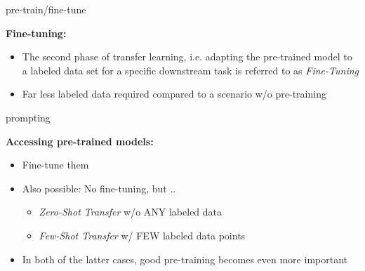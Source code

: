 
\begin{vbframe}{pre-train/fine-tune}

\vfill

\textbf{Fine-tuning:}

	\begin{itemize}
		\item The second phase of transfer learning, i.e. adapting the pre-trained model
					to a labeled data set for a specific downstream task is referred to as \textit{Fine-Tuning}
		\item Far less labeled data required compared to a scenario w/o pre-training
	\end{itemize}
	
\vfill

\end{vbframe}


\begin{vbframe}{prompting}

\vfill

\textbf{Accessing pre-trained models:}

	\begin{itemize}
		\item Fine-tune them
		\item Also possible: No fine-tuning, but .. 
			\begin{itemize}
				\item \textit{Zero-Shot Transfer} w/o ANY labeled data
				\item \textit{Few-Shot Transfer} w/ FEW labeled data points
			\end{itemize}
		\item In both of the latter cases, good pre-training becomes even more important
	\end{itemize}
	
\vfill

\end{vbframe}


